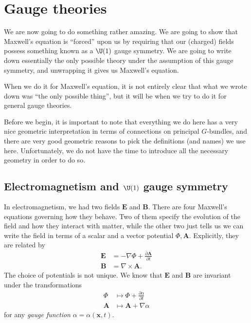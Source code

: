 \documentclass[a4paper]{article}
\begin{document}
%
%
%

\section{Gauge theories}
We are now going to do something rather amazing. We are going to show that Maxwell's equation is ``forced'' upon us by requiring that our (charged) fields possess something known as a \emph{$\U(1)$} gauge symmetry. We are going to write down essentially the only possible theory under the assumption of this gauge symmetry, and unwrapping it gives us Maxwell's equation.

When we do it for Maxwell's equation, it is not entirely clear that what we wrote down was ``the only possible thing'', but it will be when we try to do it for general gauge theories.

Before we begin, it is important to note that everything we do here has a very nice geometric interpretation in terms of connections on principal $G$-bundles, and there are very good geometric reasons to pick the definitions (and names) we use here. Unfortunately, we do not have the time to introduce all the necessary geometry in order to do so.

\subsection{Electromagnetism and \texorpdfstring{$\U(1)$}{U(1)} gauge symmetry}
In electromagnetism, we had two fields $\mathbf{E}$ and $\mathbf{B}$. There are four Maxwell's equations governing how they behave. Two of them specify the evolution of the field and how they interact with matter, while the other two just tells us we can write the field in terms of a scalar and a vector potential $\Phi, \mathbf{A}$. Explicitly, they are related by
\begin{align*}
  \mathbf{E} &= - \nabla \Phi + \frac{\partial \mathbf{A}}{\partial t}\\
  \mathbf{B} &= \nabla \times \mathbf{A}.
\end{align*}
The choice of potentials is not unique. We know that $\mathbf{E}$ and $\mathbf{B}$ are invariant under the transformations
\begin{align*}
  \Phi &\mapsto \Phi + \frac{\partial \alpha}{\partial t}\\
  \mathbf{A} &\mapsto \mathbf{A} + \nabla \alpha
\end{align*}
for any \emph{gauge function} $\alpha = \alpha(\mathbf{x}, t)$.
\end{document}
